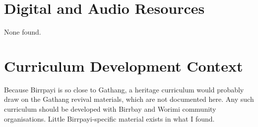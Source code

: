 \documentclass[12pt]{article}
\begin{document}
\section{Digital and Audio Resources}
None found.

\section{Curriculum Development Context}
Because Birrpayi is so close to Gathang, a heritage curriculum would probably draw on the Gathang revival materials, which are not documented here. Any such curriculum should be developed with Birrbay and Worimi community organisations. Little Birrpayi-specific material exists in what I found.
\end{document}
